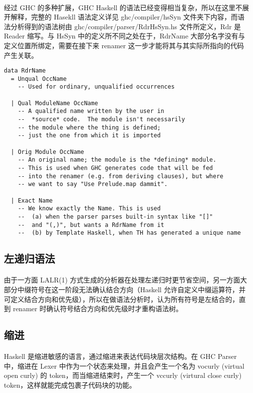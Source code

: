 \documentclass{article}
\begin{document}
 	\paragraph{}
 	经过 GHC 的多种扩展，GHC Haskell 的语法已经变得相当复杂，所以在这里不展开解释，完整的 Hasekll 语法定义详见 ghc/compiler/hsSyn 文件夹下内容，而语法分析得到的语法树由 ghc/compiler/parser/RdrHsSyn.hs 文件所定义，Rdr 是 Reader 缩写。与 HsSyn 中的定义所不同之处在于，RdrName 大部分名字没有与定义位置所绑定，需要在接下来 renamer 这一步才能将其与其实际所指向的代码产生关联。
 	\begin{verbatim}
data RdrName 
  = Unqual OccName
    -- Used for ordinary, unqualified occurrences 
 	
  | Qual ModuleName OccName
    -- A qualified name written by the user in 
    --  *source* code.  The module isn't necessarily 
    -- the module where the thing is defined; 
    -- just the one from which it is imported
 	
  | Orig Module OccName
    -- An original name; the module is the *defining* module.
    -- This is used when GHC generates code that will be fed
    -- into the renamer (e.g. from deriving clauses), but where
    -- we want to say "Use Prelude.map dammit".  
 	
  | Exact Name
    -- We know exactly the Name. This is used 
    --  (a) when the parser parses built-in syntax like "[]" 
    --  and "(,)", but wants a RdrName from it
    --  (b) by Template Haskell, when TH has generated a unique name
 	\end{verbatim}
	\subsection{左递归语法}
	\paragraph{}
	由于一方面 LALR(1) 方式生成的分析器在处理左递归时更节省空间，另一方面大部分中缀符号在这一阶段无法确认结合方向（Haskell 允许自定义中缀运算符，并可定义结合方向和优先级），所以在做语法分析时，认为所有符号是左结合的，直到 renamer 时确认符号结合方向和优先级时才重构语法树。
	\subsection{缩进}
	\paragraph{}
	Haskell 是缩进敏感的语言，通过缩进来表达代码块层次结构。在 GHC Parser 中，缩进在 Lexer 中作为一个状态来处理，并且会产生一个名为 vocurly (virtual open curly) 的 token，而当缩进结束时，产生一个 vccurly (virtural close curly) token，这样就能完成包裹子代码块的功能。
	
\end{document}
